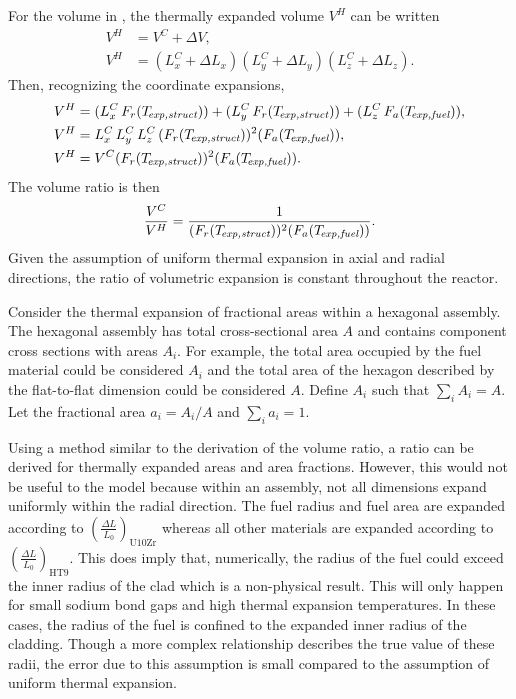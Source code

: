     For the volume in , the thermally expanded 
    volume $V^H$ can be written
    \begin{align}
      V^H &= V^C + \Delta V, \\
      V^H &= (L_x^C + \Delta L_x) (L_y^C + \Delta L_y) (L_z^C + \Delta L_z). 
    \end{align}
    Then, recognizing the coordinate expansions,
    \begin{align}
      V^H &= (L_x^C \, F_r(T_{\!\mbox{\scriptsize \em exp,struct}})) + 
        (L_y^C \, F_r(T_{\!\mbox{\scriptsize \em exp,struct}})) + 
        (L_z^C \, F_a({T_{\!\mbox{\scriptsize \em exp,fuel}}})), \\
      V^H &= L_x^C \, L_y^C \, L_z^C \, (F_r(T_{\!\mbox{\scriptsize \em exp,struct}}))^2
        (F_a({T_{\!\mbox{\scriptsize \em exp,fuel}}})), \\
      V^H &= V^C (F_r(T_{\!\mbox{\scriptsize \em exp,struct}}))^2 (F_a({T_{\!\mbox{\scriptsize \em exp,fuel}}})).
    \end{align}
    The volume ratio is then
    \begin{equation}
      \label{eq:volume_ratio}
      \frac{V^C}{V^H} = \frac{1}{(F_r(T_{\!\mbox{\scriptsize \em exp,struct}}))^2 (F_a({T_{\!\mbox{\scriptsize \em exp,fuel}}}))}.
    \end{equation}
    Given the assumption of uniform thermal expansion in axial and radial
    directions, the ratio of volumetric expansion is constant throughout the
    reactor.

    Consider the thermal expansion of fractional areas within a hexagonal
    assembly. The hexagonal assembly has total cross-sectional area $A$ and 
    contains component cross sections with areas $A_i$. For example, the total 
    area occupied by the fuel material could be considered $A_i$ and the total 
    area of the hexagon described by the flat-to-flat dimension could be 
    considered $A$. Define $A_i$ such that $\sum_{i} A_i = A$. Let the 
    fractional area $a_i = A_i/A$ and $\sum_{i} a_i = 1$.

    Using a method similar to the derivation of the volume ratio, a ratio can be
    derived for thermally expanded areas and area fractions. However, this would
    not be useful to the model because within an assembly, not all dimensions
    expand uniformly within the radial direction.
    The fuel radius and fuel area are expanded according to 
    $\left(\frac{\Delta L}{L_0}\right)_{\text{U10Zr}}$ whereas all other 
    materials are expanded according to 
    $\left(\frac{\Delta L}{L_0}\right)_{\text{HT9}}$. This does imply that,
    numerically, the radius of the fuel could exceed the inner radius of the 
    clad which is a non-physical result. This will only happen for small sodium 
    bond gaps and high thermal expansion temperatures. In these cases, the 
    radius of the fuel is confined to the expanded inner radius of the cladding.
    Though a more complex relationship describes the true value of these radii, 
    the error due to this assumption is small compared to the assumption of 
    uniform thermal expansion.
    
